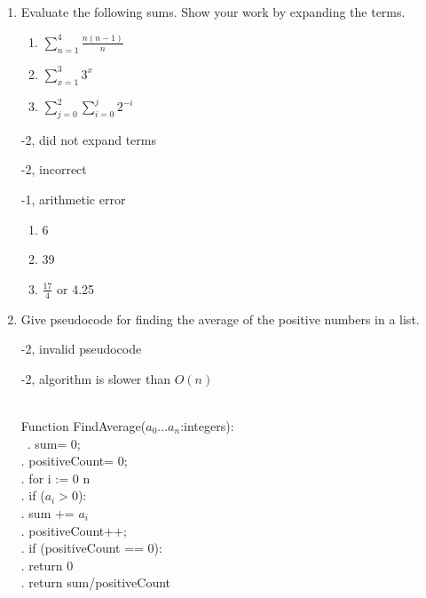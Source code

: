 \begin{enumerate}
\item Evaluate the following sums. Show your work by expanding the terms. 

\begin{enumerate}
    \item $\sum_{n=1}^{4} \frac{n(n-1)}{n}$
    \item $\sum_{x=1}^{3} 3^x$
    \item $\sum_{j=0}^{2} \sum_{i=0}^{j} 2^{-i}$
\end{enumerate}

\begin{rubric}
    -2, did not expand terms
    
    -2, incorrect
    
    -1, arithmetic error
\end{rubric}

\begin{solution}
\begin{enumerate}
    \item 6
    \item 39
    \item $\frac{17}{4}$ or 4.25
\end{enumerate}
\end{solution}

\item Give pseudocode for finding the average of the positive numbers in a list. 

\begin{rubric}
-2, invalid pseudocode

-2, algorithm is slower than $O(n)$
\end{rubric}

\begin{solution}
    \\ Function FindAverage($a_{0}...a_{n}$:integers):\\ \ . \hspace{1pt} sum= 0;\\
    . \hspace{1pt} positiveCount= 0;\\
    . \hspace{3pt} for i := 0 \rightarrow n \\ 
    . \hspace{20pt} if ($a_{i} > 0$): \\
    . \hspace{30pt} sum += $a_{i}$ \\
    . \hspace{30pt} positiveCount++;\\
    . \hspace{1pt} if (positiveCount == 0):\\
    . \hspace{5pt} return 0\\
    . \hspace{1pt} return sum/positiveCount
    

\end{solution}
\end{enumerate}
